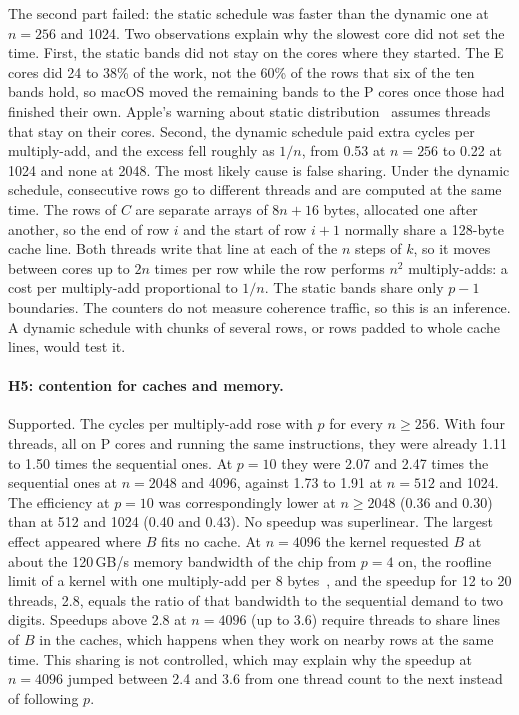 \documentclass[11pt,a4paper]{article}
\begin{document}
The second part failed: the static schedule was faster than the dynamic one at
$n=256$ and 1024. Two observations explain why the slowest core did not set the
time. First, the static bands did not stay on the cores where they started. The
E cores did 24 to 38\% of the work, not the 60\% of the rows that six of the
ten bands hold, so macOS moved the remaining bands to the P cores once those
had finished their own. Apple's warning about static
distribution~\cite{appletuning} assumes threads that stay on their cores.
Second, the dynamic schedule paid extra cycles per multiply-add, and the excess
fell roughly as $1/n$, from 0.53 at $n=256$ to 0.22 at 1024 and none at 2048.
The most likely cause is false sharing. Under the dynamic schedule, consecutive
rows go to different threads and are computed at the same time. The rows of $C$
are separate arrays of $8n+16$ bytes, allocated one after another, so the end
of row $i$ and the start of row $i+1$ normally share a 128-byte cache line. Both
threads write that line at each of the $n$ steps of $k$, so it moves between
cores up to $2n$ times per row while the row performs $n^2$ multiply-adds: a
cost per multiply-add proportional to $1/n$. The static bands share only $p-1$
boundaries. The counters do not measure coherence traffic, so this is an
inference. A dynamic schedule with chunks of several rows, or rows padded to
whole cache lines, would test it.

\paragraph{H5: contention for caches and memory.} Supported. The cycles per
multiply-add rose with $p$ for every $n\ge256$. With four threads, all on P
cores and running the same instructions, they were already 1.11 to 1.50 times
the sequential ones. At $p=10$ they were 2.07 and 2.47 times the sequential ones
at $n=2048$ and 4096, against 1.73 to 1.91 at $n=512$ and 1024. The efficiency
at $p=10$ was correspondingly lower at $n\ge2048$ (0.36 and 0.30) than at 512 and
1024 (0.40 and 0.43). No speedup was superlinear. The largest effect appeared
where $B$ fits no cache. At $n=4096$ the kernel requested $B$ at about the
120\,GB/s memory bandwidth of the chip from $p=4$ on, the roofline limit of a
kernel with one multiply-add per 8 bytes~\cite{williams2009}, and the speedup
for 12 to 20 threads, 2.8, equals the ratio of that bandwidth to the
sequential demand to two digits. Speedups above 2.8 at $n=4096$ (up to 3.6) require threads to
share lines of $B$ in the caches, which happens when they work on nearby rows at
the same time. This sharing is not controlled, which may explain why the
speedup at $n=4096$ jumped between 2.4 and 3.6 from one thread count to the next
instead of following $p$.
\end{document}
